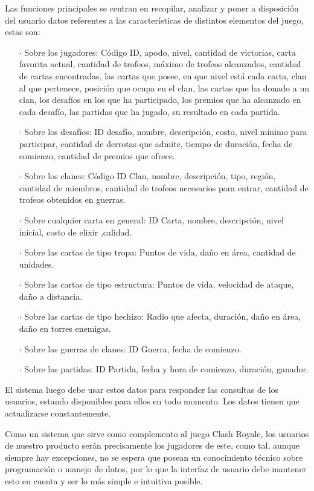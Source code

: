 Las funciones principales se centran en recopilar, analizar y poner a disposición del usuario datos referentes a las características de distintos elementos del juego, estas son:

\begin{enumerate}
  \item[\(\cdot\)] Sobre los jugadores: Código ID, apodo, nivel, cantidad de victorias, carta favorita actual, cantidad de trofeos, máximo de trofeos alcanzados, cantidad de cartas encontradas, las cartas que posee, en que nivel está cada carta, clan al que pertenece, posición que ocupa en el clan, las cartas que ha donado a un clan, los desafíos en los que ha participado, los premios que ha alcanzado en cada desafío, las partidas que ha jugado, su resultado en cada partida.
  \item[\(\cdot\)] Sobre los desafíos: ID desafío, nombre, descripción, costo, nivel mínimo para participar, cantidad de derrotas que admite, tiempo de duración, fecha de comienzo, cantidad de premios que ofrece.
  \item[\(\cdot\)] Sobre los clanes: Código ID Clan, nombre, descripción, tipo, región, cantidad de miembros, cantidad de trofeos necesarios para entrar, cantidad de trofeos obtenidos en guerras.
  \item[\(\cdot\)] Sobre cualquier carta en general: ID Carta, nombre, descripción, nivel inicial, costo de elixir ,calidad.
  \item[\(\cdot\)] Sobre las cartas de tipo tropa: Puntos de vida, daño en área, cantidad de unidades.
  \item[\(\cdot\)] Sobre las cartas de tipo estructura: Puntos de vida, velocidad de ataque, daño a distancia.
  \item[\(\cdot\)] Sobre las cartas de tipo hechizo: Radio que afecta, duración, daño en área, daño en torres enemigas.
  \item[\(\cdot\)] Sobre las guerras de clanes: ID Guerra, fecha de comienzo.
  \item[\(\cdot\)] Sobre las partidas: ID Partida, fecha y hora de comienzo, duración, ganador.
\end{enumerate}

El sistema luego debe usar estos datos para responder las consultas de los usuarios, estando disponibles para ellos en todo momento. Los datos tienen que actualizarse constantemente. 

Como un sistema que sirve como complemento al juego Clash Royale, los usuarios de nuestro producto serán precisamente los jugadores de este, como tal, aunque siempre hay excepciones, no se espera que posean un conocimiento técnico sobre programación o manejo de datos, por lo que la interfaz de usuario debe mantener esto en cuenta y ser lo más simple e intuitiva posible. 

